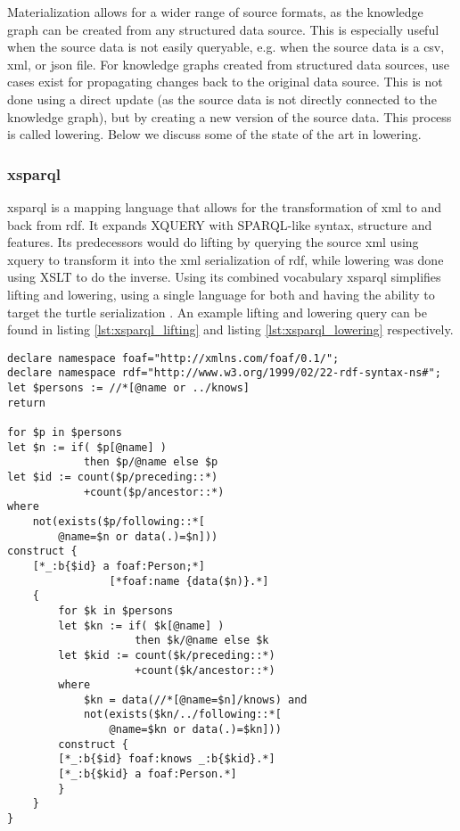 Materialization allows for a wider range of source formats, as the knowledge graph can be created from any structured data source. This is especially useful when the source data is not easily queryable, e.g. when the source data is a \acrshort{csv}, \acrshort{xml}, or \acrshort{json} file. For knowledge graphs created from structured data sources, use cases exist for propagating changes back to the original data source. This is not done using a direct update (as the source data is not directly connected to the knowledge graph), but by creating a new version of the source data. This process is called lowering. Below we discuss some of the state of the art in lowering.

\subsubsection{\acrshort*{xsparql}}
\acrshort{xsparql} is a mapping language that allows for the transformation of \acrshort{xml} to and back from \acrshort{rdf}. It expands XQUERY with SPARQL-like syntax, structure and features. Its predecessors would do lifting by querying the source \acrshort{xml} using \acrshort{xquery} to transform it into the \acrshort{xml} serialization of \acrshort{rdf}, while lowering was done using XSLT to do the inverse. Using its combined vocabulary \acrshort{xsparql} simplifies lifting and lowering, using a single language for both and having the ability to target the turtle serialization \citep{xsparql}. An example lifting and lowering query can be found in listing \ref{lst:xsparql_lifting} and listing \ref{lst:xsparql_lowering} respectively.

\begin{lstlisting}[caption={Example of \acrshort{xsparql} lifting}, label={lst:xsparql_lifting}, captionpos=b, basicstyle=\small]
declare namespace foaf="http://xmlns.com/foaf/0.1/";
declare namespace rdf="http://www.w3.org/1999/02/22-rdf-syntax-ns#";
let $persons := //*[@name or ../knows]
return

for $p in $persons
let $n := if( $p[@name] )
            then $p/@name else $p
let $id := count($p/preceding::*)
            +count($p/ancestor::*)
where
    not(exists($p/following::*[
        @name=$n or data(.)=$n]))
construct {
    [*_:b{$id} a foaf:Person;*]
                [*foaf:name {data($n)}.*]
    {
        for $k in $persons
        let $kn := if( $k[@name] )
                    then $k/@name else $k
        let $kid := count($k/preceding::*)
                    +count($k/ancestor::*)
        where
            $kn = data(//*[@name=$n]/knows) and
            not(exists($kn/../following::*[
                @name=$kn or data(.)=$kn]))
        construct {
        [*_:b{$id} foaf:knows _:b{$kid}.*]
        [*_:b{$kid} a foaf:Person.*]
        }
    }
}
\end{lstlisting}

